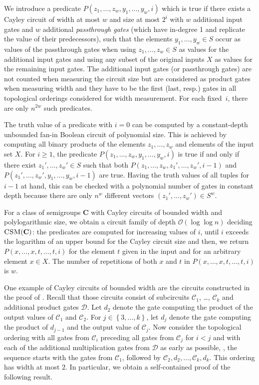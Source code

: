 \documentclass{toc}
\renewcommand{\geq}{\geqslant}
\renewcommand{\ge}{\geq}
\newcommand{\os}[1]{\ensuremath{\left\{#1\right\}}}
\newcommand{\bigO}{\mathcal{O}}
\newcommand{\vC}{\mathbf{C}}
\newcommand{\CSM}{\ensuremath{\textsc{CSM}}}
\renewcommand{\C}{\ensuremath{\mathcal{C}}}
\begin{document}
We introduce a predicate $P(z_1, \dots, z_w, y_1, \dots, y_w, i)$ which is true
if there exists a Cayley circuit of width at most $w$ and size at most $2^i$
with $w$ additional input gates and $w$ additional \emph{passthrough gates}
(which have in-degree 1 and replicate the value of their predecessors), such
that the elements $y_1, \dots, y_w \in S$ occur as values of the passthrough
gates when using $z_1, \dots, z_w \in S$ as values for the additional input
gates and using any subset of the original inputs $X$ as values for the
remaining input gates.
%
The additional input gates
%
(or passthrough gates)  %
are not counted when measuring the circuit size but are considered 
as product gates when measuring
width and they have to be the first %
(last, resp.)   %
gates in all topological orderings considered for width measurement.
%
For each fixed~$i$, there are only $n^{2w}$ such predicates.

The truth value of a predicate with $i = 0$ can be computed by a constant-depth
unbounded fan-in Boolean circuit of polynomial size. This is achieved by
computing all binary products of the elements $z_1, \dots, z_w$ and elements of
the input set $X$.
%
For $i \ge 1$, the predicate $P(z_1, \dots, z_w, y_1, \dots, y_w, i)$ is true if
and only if there exist $z_1', \dots, z_w' \in S$ such that both $P(z_1, \dots,
z_w, z_1', \dots, z_w', i-1)$ and $P(z_1', \dots, z_w', y_1, \dots, y_w, i-1)$
are true.
%
Having the truth values of all tuples for $i-1$ at hand, this can be checked
with a polynomial number of gates in constant depth because there are only
$n^w$ different vectors $(z_1', \dots, z_w') \in S^w$.

For a class of semigroups $\vC$ with Cayley circuits of bounded width and
polylogarithmic size, we obtain a circuit family of depth $\bigO(\log \log n)$
deciding $\CSM(\vC)$:
%
the predicates are computed for increasing values of $i$, until $i$ exceeds the
logarithm of an upper bound for the Cayley circuit size and then, we return
$P(x, \dots, x, t, \dots, t, i)$ for the element $t$ given in the input and for
an arbitrary element $x \in X$.
%
The number of repetitions of both $x$ and $t$ in $P(x, \dots, x, t, \dots, t,
i)$ is $w$.

One example of Cayley circuits of bounded width are the circuits constructed in
the proof of .
%
Recall that those circuits consist of subcircuits $\C_1$, \dots, $\C_k$ and
additional product gates $\mathcal{D}$.
%
Let $d_2$ denote the gate computing the product of the output values of $\C_1$
and $\C_2$. For $j \in \os{3, \dots, k}$, let $d_j$ denote the gate computing
the product of $d_{j-1}$ and the output value of $\C_j$.
%
Now consider the topological ordering with all gates from $\C_i$ preceding all
gates from $\C_j$ for $i < j$ and with each of the additional multiplication
gates from $\mathcal{D}$ as early as possible, \ie, the sequence starts with
the gates from $\C_1$, followed by $\C_2, d_2, \dots, \C_k, d_k$.
%
This ordering has width at most $2$.
%
In particular, we obtain a self-contained proof of the following result.
\end{document}

